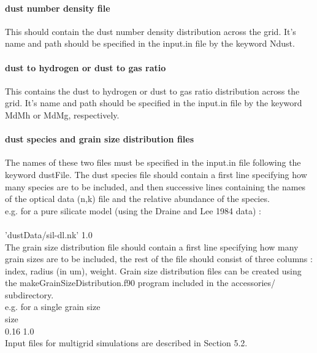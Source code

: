 \documentclass[11pt]{article}
\begin{document}
\paragraph{     dust number density file}
    This should contain the dust number density distribution across the grid. 
    It's name and path should be specified in the input.in file by the keyword 
    Ndust. 

\paragraph{     dust to hydrogen or dust to gas ratio}
    This contains the dust to hydrogen or dust to gas ratio distribution across 
    the grid. It's name and path should be specified in the input.in file by the keyword 
    MdMh or MdMg, respectively. 

\paragraph{     dust species and grain size distribution files }
    The names of these two files must be specified in the input.in file following
    the keyword dustFile. 
    The dust species file should contain a first line specifying how many species are 
    to be included, and then successive lines containing the names of the optical data (n,k) 
    file and the relative abundance of the species. \\
\noindent    e.g. for a pure silicate model (using the Draine and Lee 1984 data) :\\
\\
\noindent       'dustData/sil-dl.nk' 1.0\\
    The grain size distribution file should contain a first 
    line specifying how many grain sizes are to be included, the rest of the file
    should consist of three columns : index, radius (in um), weight. Grain size 
    distribution files can be created using the makeGrainSizeDistribution.f90 
    program included in the accessories/ subdirectory. \\
\noindent e.g. for a single grain size \\
 size\\
 0.16 1.0\\

    Input files for multigrid simulations are described in Section 5.2. \\
\end{document}

